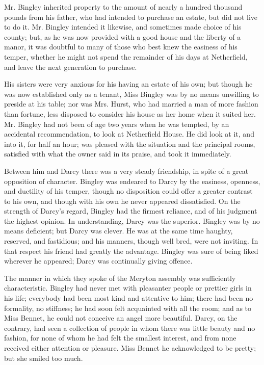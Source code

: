 \documentclass[12pt,openright]{book}
\begin{document}
Mr. Bingley inherited property to the amount of nearly a hundred thousand pounds from his father, who had intended to purchase an estate, but did not live to do it. Mr. Bingley intended it likewise, and sometimes made choice of his county; but, as he was now provided with a good house and the liberty of a manor, it was doubtful to many of those who best knew the easiness of his temper, whether he might not spend the remainder of his days at Netherfield, and leave the next generation to purchase.

His sisters were very anxious for his having an estate of his own; but though he was now established only as a tenant, Miss Bingley was by no means unwilling to preside at his table; nor was Mrs. Hurst, who had married a man of more fashion than fortune, less disposed to consider his house as her home when it suited her. Mr. Bingley had not been of age two years when he was tempted, by an accidental recommendation, to look at Netherfield House. He did look at it, and into it, for half an hour; was pleased with the situation and the principal rooms, satisfied with what the owner said in its praise, and took it immediately.

Between him and Darcy there was a very steady friendship, in spite of a great opposition of character. Bingley was endeared to Darcy by the easiness, openness, and ductility of his temper, though no disposition could offer a greater contrast to his own, and though with his own he never appeared dissatisfied. On the strength of Darcy’s regard, Bingley had the firmest reliance, and of his judgment the highest opinion. In understanding, Darcy was the superior. Bingley was by no means deficient; but Darcy was clever. He was at the same time haughty, reserved, and fastidious; and his manners, though well bred, were not inviting. In that respect his friend had greatly the advantage. Bingley was sure of being liked wherever he appeared; Darcy was continually giving offence.

The manner in which they spoke of the Meryton assembly was sufficiently characteristic. Bingley had never met with pleasanter people or prettier girls in his life; everybody had been most kind and attentive to him; there had been no formality, no stiffness; he had soon felt acquainted with all the room; and as to Miss Bennet, he could not conceive an angel more beautiful. Darcy, on the contrary, had seen a collection of people in whom there was little beauty and no fashion, for none of whom he had felt the smallest interest, and from none received either attention or pleasure. Miss Bennet he acknowledged to be pretty; but she smiled too much.
\end{document}
